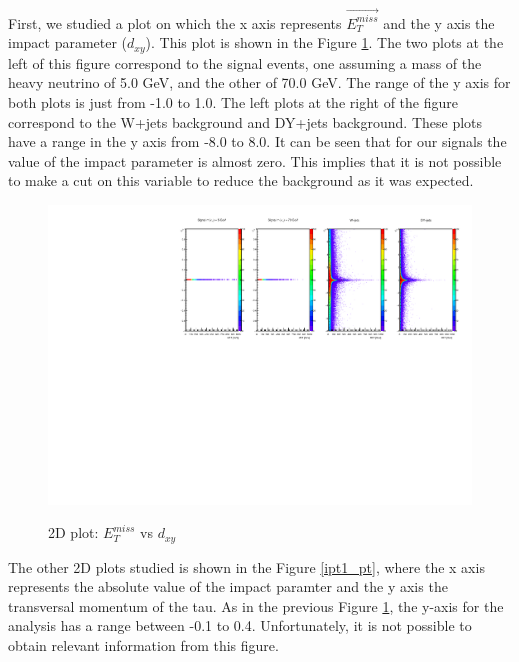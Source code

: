 First, we studied a plot on which the x axis 
represents $\vec{E_T^{miss}}$ and the y axis the impact parameter ($d_{xy}$). This plot is shown in the Figure \ref{ipt1_MET}. The two plots at the left of this figure correspond to the signal events, one 
assuming a mass of the heavy neutrino of 5.0 GeV, and the other of 70.0 GeV. The range of the y axis for both plots is just from -1.0 to 1.0. The left plots at the right of the figure correspond 
to the W+jets background and DY+jets background. These plots have a range in the y axis from -8.0 to 8.0. It can be seen that for our signals the value of the impact parameter is almost zero. 
This implies that it is not possible to make a cut on this variable to reduce the background as it was expected. 
 
 \begin{figure}[h] 
 \centering
 \caption{2D plot: $E_T^{miss}$ vs $d_{xy}$}
 \includegraphics[width=1.15\textwidth]{./Capitulos/Analysis/c1} 
 \label{ipt1_MET}
 \end{figure}
 
The other 2D plots studied is shown in the Figure \ref{ipt1_pt}, where the x axis represents the absolute value of the impact paramter and the y axis the transversal momentum of the tau. As in the previous Figure \ref{ipt1_MET}, the y-axis for the analysis has a range between -0.1 to 0.4. Unfortunately, it is not possible to obtain relevant information from this figure.
 
